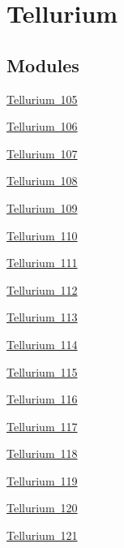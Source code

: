 \hypertarget{group___isotope_const-_tellurium}{}\section{Tellurium}
\label{group___isotope_const-_tellurium}
\subsection*{Modules}
\begin{DoxyCompactItemize}
\item 
\mbox{\hyperlink{group___isotope_const-_tellurium-_te105}{Tellurium 105}}
\item 
\mbox{\hyperlink{group___isotope_const-_tellurium-_te106}{Tellurium 106}}
\item 
\mbox{\hyperlink{group___isotope_const-_tellurium-_te107}{Tellurium 107}}
\item 
\mbox{\hyperlink{group___isotope_const-_tellurium-_te108}{Tellurium 108}}
\item 
\mbox{\hyperlink{group___isotope_const-_tellurium-_te109}{Tellurium 109}}
\item 
\mbox{\hyperlink{group___isotope_const-_tellurium-_te110}{Tellurium 110}}
\item 
\mbox{\hyperlink{group___isotope_const-_tellurium-_te111}{Tellurium 111}}
\item 
\mbox{\hyperlink{group___isotope_const-_tellurium-_te112}{Tellurium 112}}
\item 
\mbox{\hyperlink{group___isotope_const-_tellurium-_te113}{Tellurium 113}}
\item 
\mbox{\hyperlink{group___isotope_const-_tellurium-_te114}{Tellurium 114}}
\item 
\mbox{\hyperlink{group___isotope_const-_tellurium-_te115}{Tellurium 115}}
\item 
\mbox{\hyperlink{group___isotope_const-_tellurium-_te116}{Tellurium 116}}
\item 
\mbox{\hyperlink{group___isotope_const-_tellurium-_te117}{Tellurium 117}}
\item 
\mbox{\hyperlink{group___isotope_const-_tellurium-_te118}{Tellurium 118}}
\item 
\mbox{\hyperlink{group___isotope_const-_tellurium-_te119}{Tellurium 119}}
\item 
\mbox{\hyperlink{group___isotope_const-_tellurium-_te120}{Tellurium 120}}
\item 
\mbox{\hyperlink{group___isotope_const-_tellurium-_te121}{Tellurium 121}}

\end{DoxyCompactItemize}
